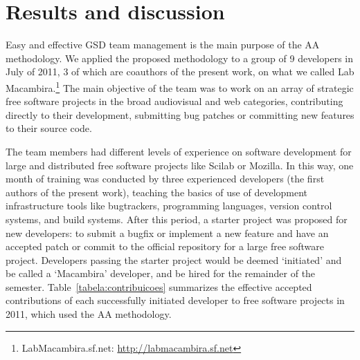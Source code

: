 \documentclass{article}
\begin{document}

\section{Results and discussion}
\label{results}

Easy and effective GSD team management is the main purpose of the AA
methodology. We applied the proposed methodology to a group of 9 developers in
July of 2011, 3 of which are coauthors of the present work, on what we called Lab
Macambira.\footnote{LabMacambira.sf.net: \url{http://labmacambira.sf.net}} The
main objective of the team was to work on an array of strategic free software
projects in the broad audiovisual and web categories, contributing directly to
their development, submitting bug patches or committing new features to their
source code.

The team members had different levels of experience on software development for
large and distributed free software projects like Scilab or Mozilla. In this
way, one month of training was conducted by three experienced developers (the
first authors of the present work), teaching
the basics of use of development infrastructure tools like bugtrackers, programming
languages, version control systems, and build systems. After this period, a
starter project was proposed for new developers: to submit a bugfix or implement
a new feature and have an accepted
patch or commit to the official repository for a large free
software project.  Developers passing the starter project would be deemed
`initiated' and be called a `Macambira' developer, and be hired for the
remainder of the semester.
Table~\ref{tabela:contribuicoes} summarizes the effective accepted contributions
of each successfully initiated developer to free software projects in 2011,
which used the AA methodology.

\end{document}
